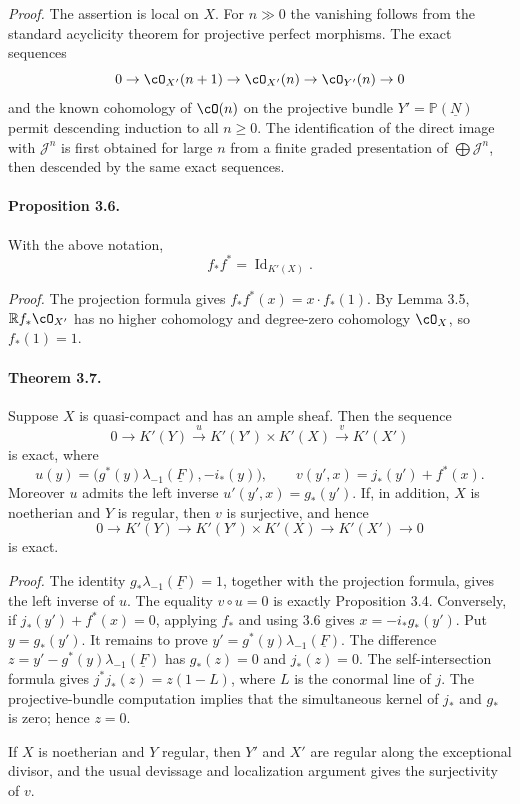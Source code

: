 \documentclass[11pt]{article}
\theoremstyle{plain}
\theoremstyle{definition}
\theoremstyle{remark}
\newcommand{\bbP}{\mathbb P}
\newcommand{\RR}{\mathbb R}
\newcommand{\cJ}{\mathcal J}\newcommand{\cK}{\mathcal K}\newcommand{\cL}{\mathcal L}
\providecommand{\Id}{\operatorname{Id}}
\providecommand{\xto}[1]{\xrightarrow{#1}}
\providecommand{\uF}{\underline{F}}
\providecommand{\uN}{\underline{N}}
\begin{document}
\emph{Proof.} The assertion is local on $X$. For $n\gg0$ the vanishing follows from the standard acyclicity theorem for projective perfect morphisms. The exact sequences
\[
0\to\cO_{X'}(n+1)\to\cO_{X'}(n)\to\cO_{Y'}(n)\to0
\]
and the known cohomology of $\cO(n)$ on the projective bundle $Y'=\bbP(\uN)$ permit descending induction to all $n\geq0$. The identification of the direct image with $\cJ^n$ is first obtained for large $n$ from a finite graded presentation of $\bigoplus\cJ^n$, then descended by the same exact sequences.

\paragraph{Proposition 3.6.} With the above notation,
\[
f_*f^*=\Id_{K'(X)}.
\]

\emph{Proof.} The projection formula gives $f_*f^*(x)=x\cdot f_*(1)$. By Lemma 3.5, $\RR f_*\cO_{X'}$ has no higher cohomology and degree-zero cohomology $\cO_X$, so $f_*(1)=1$.

\paragraph{Theorem 3.7.} Suppose $X$ is quasi-compact and has an ample sheaf. Then the sequence
\[
0\longrightarrow K'(Y)\xto{u}K'(Y')\times K'(X)\xto{v}K'(X')
\]
is exact, where
\[
u(y)=\bigl(g^*(y)\lambda_{-1}(\uF),-i_*(y)\bigr),
\qquad
v(y',x)=j_*(y')+f^*(x).
\]
Moreover $u$ admits the left inverse $u'(y',x)=g_*(y')$. If, in addition, $X$ is noetherian and $Y$ is regular, then $v$ is surjective, and hence
\[
0\to K'(Y)\to K'(Y')\times K'(X)\to K'(X')\to0
\]
is exact.

\emph{Proof.} The identity $g_*\lambda_{-1}(\uF)=1$, together with the projection formula, gives the left inverse of $u$. The equality $v\circ u=0$ is exactly Proposition 3.4. Conversely, if $j_*(y')+f^*(x)=0$, applying $f_*$ and using 3.6 gives $x=-i_*g_*(y')$. Put $y=g_*(y')$. It remains to prove $y'=g^*(y)\lambda_{-1}(\uF)$. The difference $z=y'-g^*(y)\lambda_{-1}(\uF)$ has $g_*(z)=0$ and $j_*(z)=0$. The self-intersection formula gives $j^*j_*(z)=z(1-L)$, where $L$ is the conormal line of $j$. The projective-bundle computation implies that the simultaneous kernel of $j_*$ and $g_*$ is zero; hence $z=0$.

If $X$ is noetherian and $Y$ regular, then $Y'$ and $X'$ are regular along the exceptional divisor, and the usual devissage and localization argument gives the surjectivity of $v$.
\end{document}
